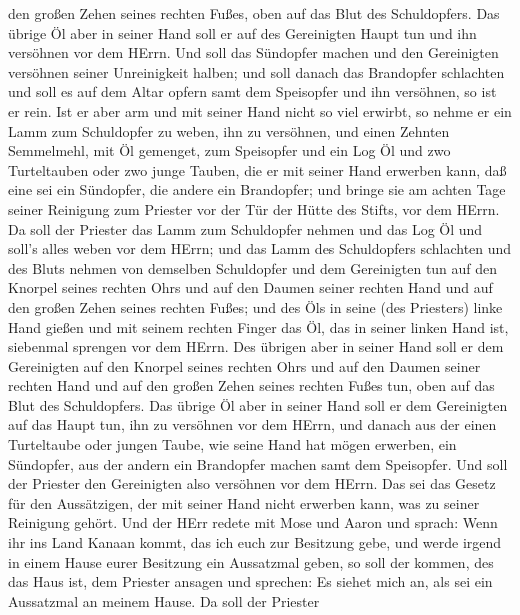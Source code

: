 den großen Zehen seines rechten Fußes, oben auf das Blut des
Schuldopfers.  Das übrige Öl aber in seiner Hand soll er
auf des Gereinigten Haupt tun und ihn versöhnen vor dem HErrn.
 Und soll das Sündopfer machen und den Gereinigten
versöhnen seiner Unreinigkeit halben; und soll danach das Brandopfer
schlachten  und soll es auf dem Altar opfern samt dem
Speisopfer und ihn versöhnen, so ist er rein.  Ist er aber
arm und mit seiner Hand nicht so viel erwirbt, so nehme er ein Lamm zum
Schuldopfer zu weben, ihn zu versöhnen, und einen Zehnten Semmelmehl,
mit Öl gemenget, zum Speisopfer und ein Log Öl  und zwo
Turteltauben oder zwo junge Tauben, die er mit seiner Hand erwerben
kann, daß eine sei ein Sündopfer, die andere ein Brandopfer;
 und bringe sie am achten Tage seiner Reinigung zum
Priester vor der Tür der Hütte des Stifts, vor dem HErrn. 
Da soll der Priester das Lamm zum Schuldopfer nehmen und das Log Öl und
soll's alles weben vor dem HErrn;  und das Lamm des
Schuldopfers schlachten und des Bluts nehmen von demselben Schuldopfer
und dem Gereinigten tun auf den Knorpel seines rechten Ohrs und auf den
Daumen seiner rechten Hand und auf den großen Zehen seines rechten
Fußes;  und des Öls in seine (des Priesters) linke Hand
gießen  und mit seinem rechten Finger das Öl, das in seiner
linken Hand ist, siebenmal sprengen vor dem HErrn.  Des
übrigen aber in seiner Hand soll er dem Gereinigten auf den Knorpel
seines rechten Ohrs und auf den Daumen seiner rechten Hand und auf den
großen Zehen seines rechten Fußes tun, oben auf das Blut des
Schuldopfers.  Das übrige Öl aber in seiner Hand soll er
dem Gereinigten auf das Haupt tun, ihn zu versöhnen vor dem HErrn,
 und danach aus der einen Turteltaube oder jungen Taube,
wie seine Hand hat mögen erwerben,  ein Sündopfer, aus der
andern ein Brandopfer machen samt dem Speisopfer. Und soll der Priester
den Gereinigten also versöhnen vor dem HErrn.  Das sei das
Gesetz für den Aussätzigen, der mit seiner Hand nicht erwerben kann, was
zu seiner Reinigung gehört.  Und der HErr redete mit Mose
und Aaron und sprach:  Wenn ihr ins Land Kanaan kommt, das
ich euch zur Besitzung gebe, und werde irgend in einem Hause eurer
Besitzung ein Aussatzmal geben,  so soll der kommen, des
das Haus ist, dem Priester ansagen und sprechen: Es siehet mich an, als
sei ein Aussatzmal an meinem Hause.  Da soll der Priester
